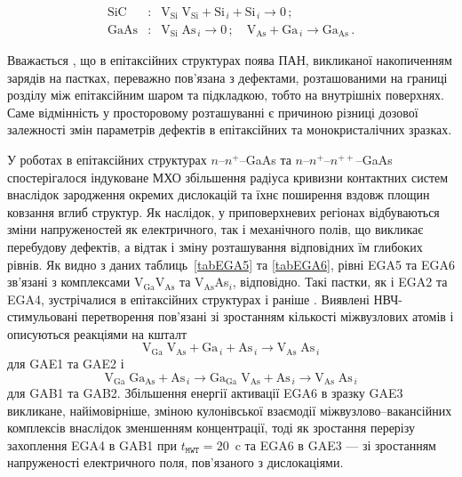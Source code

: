 \begin{eqnarray*}
  \text{SiC}&:&\text{V}_\text{Si}\;\text{V}_\text{Si}+\text{Si}_{\,i}+ \text{Si}_{\,i} \rightarrow 0\,;\\
  \text{GaAs}&:&\text{V}_\text{Si}\;\text{As}_{\,i} \rightarrow 0\,;\quad
  \text{V}_\text{As}+\text{Ga}_{\,i} \rightarrow \text{Ga}_\text{As}\,.
\end{eqnarray*}

Вважається \cite{Saiko1993,OlikhSSC,OstrovPAN}, що в епітаксійних структурах поява ПАН, викликаної накопиченням зарядів на пастках, переважно пов'язана з дефектами, розташованими на границі розділу між епітаксійним шаром та підкладкою,
тобто на внутрішніх поверхнях.
Саме відмінність у просторовому розташуванні є причиною різниці дозової залежності змін параметрів дефектів в епітаксійних та монокристалічних зразках.

У роботах \cite{Boltovets,Konakova2012FTP} в епітаксійних структурах $n$--$n^+$--GaAs та $n$--$n^+$--$n^{++}$--GaAs спостерігалося індуковане МХО збільшення радіуса кривизни контактних систем внаслідок зародження окремих дислокацій та їхнє поширення вздовж площин ковзання вглиб структур.
Як наслідок, у приповерхневих регіонах відбуваються зміни напруженостей як електричного, так і механічного полів,
що викликає перебудову дефектів, а відтак і зміну розташування відповідних їм глибоких рівнів.
Як видно з даних таблиць~\ref{tabEGA5} та \ref{tabEGA6}, рівні EGA5 та EGA6 зв'язані з комплексами V$_\text{Ga}$V$_\text{As}$ та V$_\text{As}$As$_i$, відповідно.
Такі пастки, як і EGA2 та EGA4, зустрічалися в епітаксійних структурах і раніше \cite{Yousefi1995,Mircea1975,Bourgoin:GaAs,ASHBY:GaAs,Fang:EL6,Lefevre1977,KolFTP1989r}.
Виявлені НВЧ-стимульовані перетворення пов'язані зі зростанням кількості міжвузлових атомів і описуються
реакціями на кшталт
\begin{equation*}
  \text{V}_\text{Ga}\;\text{V}_\text{As}+\text{Ga}_{\,i}+\text{As}_{\,i} \rightarrow \text{V}_\text{As}\;\text{As}_{\,i}
\end{equation*}
для GAE1 та GAE2 і
\begin{equation*}
  \text{V}_\text{Ga}\;\text{Ga}_\text{As}+\text{As}_{\,i} \rightarrow
  \text{Ga}_\text{Ga}\;\text{V}_\text{As}+\text{As}_{\,i} \rightarrow
  \text{V}_\text{As}\;\text{As}_{\,i}
\end{equation*}
для GAB1 та GAB2.
Збільшення енергії активації EGA6 в зразку GAE3 викликане, найімовірніше, зміною кулонівської взаємодії міжвузлово--вакансійних комплексів внаслідок зменшенням концентрації,
тоді як зростання перерізу захоплення EGA4 в GAB1 при $t_\mathtt{MWT}=20$~c та EGA6 в GAE3  --- зі зростанням напруженості електричного поля, пов'язаного з дислокаціями.


